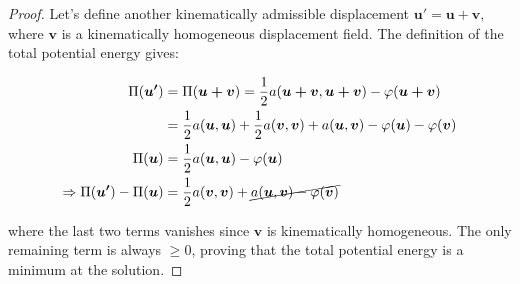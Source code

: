 	\begin{proof}
	Let's define another kinematically admissible displacement $\bm{u'= u+v},$ where $\bm{v}$ is a kinematically homogeneous displacement field. The definition of the total potential energy gives: 
	
	\begin{equation}
	\begin{aligned}
	\Pi (\bm{u'}) &= \Pi (\bm{u+v}) = \frac{1}{2} a(\bm{u+v},\bm{u+v}) - \varphi (\bm{u+v})\\ 
	&= \frac{1}{2} a(\bm{u},\bm{u}) + \frac{1}{2} a(\bm{v}, \bm{v}) + a(\bm{u},\bm{v}) - \varphi (\bm{u}) - \varphi (\bm{v})\\
	\Pi(\bm{u}) &= \frac{1}{2} a(\bm{u},\bm{u}) - \varphi (\bm{u})\\
	\Rightarrow \Pi (\bm{u'}) -\Pi(\bm{u}) &=  \frac{1}{2} a(\bm{v}, \bm{v}) + \cancel{a(\bm{u},\bm{v}) - \varphi (\bm{v})} 
	\end{aligned}
	\end{equation}
	
	where the last two terms vanishes since $\bm{v}$ is kinematically homogeneous. The only remaining term is always $\geq 0$, proving that the total potential energy is a minimum at the solution.
	\end{proof}
	